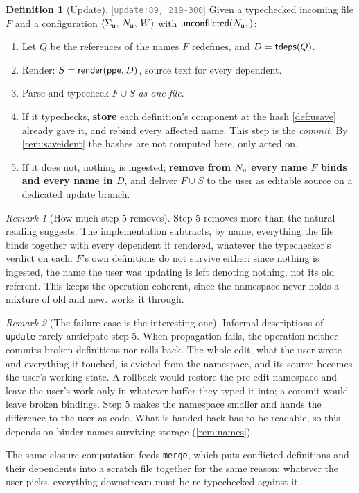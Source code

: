 \documentclass[11pt]{article}
\theoremstyle{definition}
\newtheorem{definition}{Definition}[section]
\theoremstyle{plain}
\theoremstyle{remark}
\newtheorem{remark}{Remark}[section]
\newcommand{\src}[1]{{\footnotesize\textcolor{gray}{[\texttt{#1}]}}}
\begin{document}
\begin{definition}[Update]\label{def:update}
\src{update:89, 219-300} Given a typechecked incoming file $F$ and a
configuration $\langle \Sigma_{\mathsf{u}},\, N_{\mathsf{u}},\, W\rangle$ with $\mathsf{unconflicted}(N_{\mathsf{u}},)$:
\begin{enumerate}[nosep,label=\arabic*.]
  \item Let $Q$ be the references of the names $F$ redefines, and $D = \mathsf{tdeps}(Q)$.
  \item Render: $S = \mathsf{render}(\mathsf{ppe}, D)$, source text for every dependent.
  \item Parse and typecheck $F \cup S$ \emph{as one file}.
  \item If it typechecks, \textbf{store} each definition's component at the hash
        \cref{def:usave} already gave it, and rebind every affected name. This step is the
        \emph{commit}. By \cref{rem:saveident} the hashes are not computed here, only acted on.
  \item If it does not, nothing is ingested; \textbf{remove from $N_{\mathsf{u}}$ every name $F$ binds and
        every name in $D$}, and deliver $F \cup S$ to the user as editable source on a dedicated
        update branch.
\end{enumerate}
\end{definition}

\begin{remark}[How much step 5 removes]\label{rem:step5}
Step 5 removes more than the natural reading suggests. The implementation subtracts, by name,
everything the file binds together with every dependent it rendered, whatever the typechecker's
verdict on each. $F$'s own definitions do not survive either: since nothing is ingested, the name the
user was updating is left denoting nothing, not its old referent. This keeps the operation coherent,
since the namespace never holds a mixture of old and new.  works it through.
\end{remark}

\begin{remark}[The failure case is the interesting one]\label{rem:residual}
Informal descriptions of \texttt{update} rarely anticipate step 5. When propagation fails, the
operation neither commits broken definitions nor rolls back. The whole edit, what the user wrote and
everything it touched, is evicted from the namespace, and its source becomes the user's working
state. A rollback would restore the pre-edit namespace and leave the user's work only in whatever
buffer they typed it into; a commit would leave broken bindings. Step 5 makes the namespace smaller
and hands the difference to the user as code. What is handed back has to be readable, so this
depends on binder names surviving storage (\cref{rem:names}).

The same closure computation feeds \texttt{merge}, which puts conflicted definitions and their
dependents into a scratch file together for the same reason: whatever the user picks, everything
downstream must be re-typechecked against it.
\end{remark}
\end{document}
